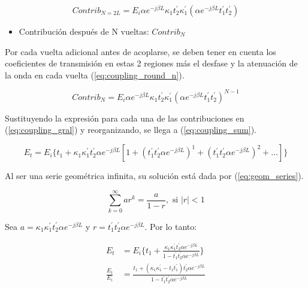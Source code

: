 \begin{equation}
Contrib_{N=2L} = E_i \alpha e^{-j \beta L} \kappa_1 t_2^{'} \kappa_1^{'} (\alpha e^{-j \beta L} t_1^{'} t_2^{'})
\label{eq:coupling_round_2}
\end{equation} 

\begin{itemize}
\item Contribución después de N vueltas: $Contrib_N$
\end{itemize} 

Por cada vuelta adicional antes de acoplarse, se deben tener en cuenta los 
coeficientes de transmisión en estas 2 regiones más el desfase y la atenuación de la 
onda en cada vuelta (\ref{eq:coupling_round_n}).

\begin{equation}
Contrib_N = E_i \alpha e^{-j \beta L} \kappa_1 t_2^{'} \kappa_1^{'} (\alpha e^{-j \beta L} t_1^{'} t_2^{'})^{N-1}
\label{eq:coupling_round_n}
\end{equation} 

Sustituyendo la expresión para cada una de las contribuciones en 
(\ref{eq:coupling_gral}) y reorganizando, se llega a (\ref{eq:coupling_sum}).


\begin{equation}
E_t = E_i\{
t_1+
\kappa_1\kappa_1^{'} t_2^{'} \alpha e^{-j \beta L} [
1 +
(t_1^{'} t_2^{'} \alpha e^{-j \beta L})^1 +
(t_1^{'} t_2^{'} \alpha e^{-j \beta L})^2 +
...]\}
\label{eq:coupling_sum}
\end{equation}

Al ser una serie geométrica infinita, su solución está dada por (\ref{eq:geom_series}).

\begin{equation}
\sum\limits_{k = 0}^\infty {ar^{k} = \frac{a}{{1 - r}}}, \text{ si } |r| < 1
\label{eq:geom_series}
\end{equation} 

Sea 
$a = \kappa_1 \kappa_1^{'} t_2^{'} \alpha e^{-j \beta L} $ y  
$r = t_1^{'} t_2^{'} \alpha e^{-j \beta L}$.
Por lo tanto:

\begin{subequations}
\begin{align}
E_t &= E_i\{t_1 + 
\frac{ \kappa_1 \kappa_1^{'} t_2^{'} \alpha e^{-j \beta L}}
{1 - t_1^{'} t_2^{'} \alpha e^{-j \beta L}} \} \\
\frac{E_t}{E_i} &= 
    \frac{t_1 + (\kappa_1 \kappa_1^{'} - t_1 t_1^{'})t_2^{'} \alpha e^{-j \beta L}}
    {1 - t_1^{'} t_2^{'} \alpha e^{-j \beta L}}
\label{eq:t_through}
\end{align} 
\end{subequations}

